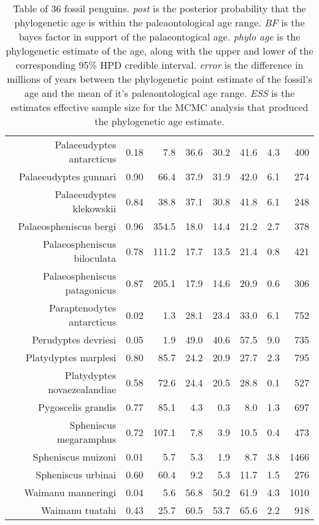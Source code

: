 \begin{table}[ht]
\begin{tabular}{rrrrrrrr}
  Palaeeudyptes antarcticus & 0.18 & 7.8 & 36.6 & 30.2 & 41.6 & 4.3 & 400 \\ 
  Palaeeudyptes gunnari & 0.90 & 66.4 & 37.9 & 31.9 & 42.0 & 6.1 & 274 \\ 
  Palaeeudyptes klekowskii & 0.84 & 38.8 & 37.1 & 30.8 & 41.8 & 6.1 & 248 \\ 
  Palaeospheniscus bergi & 0.96 & 354.5 & 18.0 & 14.4 & 21.2 & 2.7 & 378 \\ 
  Palaeospheniscus biloculata & 0.78 & 111.2 & 17.7 & 13.5 & 21.4 & 0.8 & 421 \\ 
  Palaeospheniscus patagonicus & 0.87 & 205.1 & 17.9 & 14.6 & 20.9 & 0.6 & 306 \\ 
  Paraptenodytes antarcticus & 0.02 & 1.3 & 28.1 & 23.4 & 33.0 & 6.1 & 752 \\ 
  Perudyptes devriesi & 0.05 & 1.9 & 49.0 & 40.6 & 57.5 & 9.0 & 735 \\ 
  Platydyptes marplesi & 0.80 & 85.7 & 24.2 & 20.9 & 27.7 & 2.3 & 795 \\ 
  Platydyptes novaezealandiae & 0.58 & 72.6 & 24.4 & 20.5 & 28.8 & 0.1 & 527 \\ 
  Pygoscelis grandis & 0.77 & 85.1 & 4.3 & 0.3 & 8.0 & 1.3 & 697 \\ 
  Spheniscus megaramphus & 0.72 & 107.1 & 7.8 & 3.9 & 10.5 & 0.4 & 473 \\ 
  Spheniscus muizoni & 0.01 & 5.7 & 5.3 & 1.9 & 8.7 & 3.8 & 1466 \\ 
  Spheniscus urbinai & 0.60 & 60.4 & 9.2 & 5.3 & 11.7 & 1.5 & 276 \\ 
  Waimanu manneringi & 0.04 & 5.6 & 56.8 & 50.2 & 61.9 & 4.3 & 1010 \\ 
  Waimanu tuatahi & 0.43 & 25.7 & 60.5 & 53.7 & 65.6 & 2.2 & 918 \\ 
   \hline
\end{tabular}
\caption{Table of 36 fossil penguins. {\em post} is the posterior probability that the phylogenetic age is within the paleaontological age range. {\em BF} is the bayes factor in support of the palaeontogical age. {\em phylo age} is the phylogenetic estimate of the age, along with the upper and lower of the corresponding 95\% HPD credible interval. {\em error} is the difference in millions of years between the phylogenetic point estimate of the fossil's age and the mean of it's paleaontological age range. {\em ESS} is the estimates effective sample size for the MCMC analysis that produced the phylogenetic age estimate.} 
\label{fossilTable}
\end{table}
